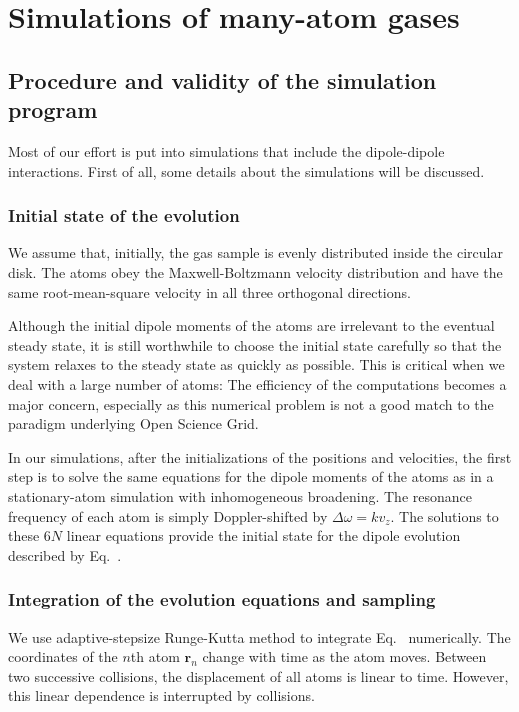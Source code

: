 \section{Simulations of many-atom gases}
\subsection{Procedure and validity of the simulation program}

Most of our effort is put into simulations that include the dipole-dipole interactions. First of all, some details about the simulations will be discussed. 

\subsubsection{Initial state of the evolution}

We assume that, initially, the gas sample is evenly distributed inside the circular disk. The atoms obey the Maxwell-Boltzmann velocity distribution and have the same root-mean-square velocity in all three orthogonal directions.

Although the initial  dipole moments of the atoms are irrelevant to the eventual steady state, it is still worthwhile to  choose the initial state carefully so that the system relaxes to the steady state as quickly as possible. This is critical when we deal with a large number of atoms: The efficiency of the computations becomes a major concern, especially as this numerical problem is not a good match to the paradigm underlying Open Science Grid.

In our simulations, after the initializations of the positions and velocities, the first step is to solve the same equations for the dipole moments of the atoms as in a stationary-atom simulation with inhomogeneous broadening. The resonance frequency of each atom is simply Doppler-shifted by $\Delta\omega=kv_z$. The solutions to these $6N$ linear equations provide the initial state for the dipole evolution described by Eq.~.

\subsubsection{Integration of the evolution equations and sampling}

We use adaptive-stepsize Runge-Kutta method to integrate Eq.~ numerically. The coordinates of the $n$th atom $\mathbf{r}_n$ change with time as the atom moves. Between two successive collisions, the displacement of all atoms is linear to time. However, this linear dependence is interrupted by collisions.


